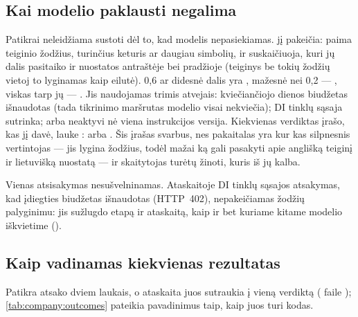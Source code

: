 \subsection{Kai modelio paklausti negalima}\label{sec:company:overlap}

Patikrai neleidžiama sustoti dėl to, kad modelis nepasiekiamas.  jį pakeičia:
paima teiginio žodžius, turinčius keturis ar daugiau simbolių, ir suskaičiuoja, kuri jų dalis
pasitaiko ir nuostatos antraštėje bei pradžioje (teiginys be tokių žodžių vietoj to lyginamas
kaip eilutė). 0,6 ar didesnė dalis yra , mažesnė nei 0,2 --- , viskas
tarp jų --- . Jis naudojamas trimis atvejais: kviečiančiojo dienos biudžetas
išnaudotas (tada tikrinimo maršrutas modelio visai nekviečia); DI tinklų sąsaja sutrinka; arba
neaktyvi nė viena instrukcijos versija. Kiekvienas verdiktas įrašo, kas jį davė, lauke
:  arba . Šis įrašas svarbus, nes pakaitalas yra kur
kas silpnesnis vertintojas --- jis lygina žodžius, todėl mažai ką gali pasakyti apie anglišką
teiginį ir lietuvišką nuostatą --- ir skaitytojas turėtų žinoti, kuris iš jų kalba.

Vienas atsisakymas nesušvelninamas. Ataskaitoje DI tinklų sąsajos atsakymas, kad įdiegties
biudžetas išnaudotas (HTTP~402), nepakeičiamas žodžių palyginimu: jis sužlugdo etapą ir
ataskaitą, kaip ir bet kuriame kitame modelio iškvietime ().

\subsection{Kaip vadinamas kiekvienas rezultatas}\label{sec:company:outcomes}

Patikra atsako dviem laukais, o ataskaita juos sutraukia į vieną verdiktą
( faile ); \cref{tab:company:outcomes}
pateikia pavadinimus taip, kaip juos turi kodas.

